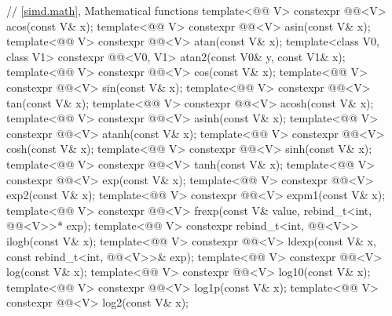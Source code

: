 \begin{codeblock}
{  // \ref{simd.math}, Mathematical functions
  template<@@ V> constexpr @@<V> acos(const V& x);
  template<@@ V> constexpr @@<V> asin(const V& x);
  template<@@ V> constexpr @@<V> atan(const V& x);
  template<class V0, class V1>
    constexpr @@<V0, V1> atan2(const V0& y, const V1& x);
  template<@@ V> constexpr @@<V> cos(const V& x);
  template<@@ V> constexpr @@<V> sin(const V& x);
  template<@@ V> constexpr @@<V> tan(const V& x);
  template<@@ V> constexpr @@<V> acosh(const V& x);
  template<@@ V> constexpr @@<V> asinh(const V& x);
  template<@@ V> constexpr @@<V> atanh(const V& x);
  template<@@ V> constexpr @@<V> cosh(const V& x);
  template<@@ V> constexpr @@<V> sinh(const V& x);
  template<@@ V> constexpr @@<V> tanh(const V& x);
  template<@@ V> constexpr @@<V> exp(const V& x);
  template<@@ V> constexpr @@<V> exp2(const V& x);
  template<@@ V> constexpr @@<V> expm1(const V& x);
  template<@@ V>
    constexpr @@<V>
      frexp(const V& value, rebind_t<int, @@<V>>* exp);
  template<@@ V>
    constexpr rebind_t<int, @@<V>> ilogb(const V& x);
  template<@@ V> constexpr @@<V> ldexp(const V& x, const
  rebind_t<int, @@<V>>& exp);
  template<@@ V> constexpr @@<V> log(const V& x);
  template<@@ V> constexpr @@<V> log10(const V& x);
  template<@@ V> constexpr @@<V> log1p(const V& x);
  template<@@ V> constexpr @@<V> log2(const V& x);
}
\end{codeblock}
